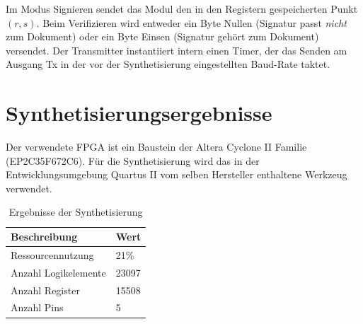 Im Modus Signieren sendet das Modul den in den Registern gespeicherten Punkt $(r, s)$. Beim Verifizieren wird entweder ein Byte Nullen (Signatur passt \textit{nicht} zum Dokument) oder ein Byte Einsen (Signatur gehört zum Dokument) versendet. Der Transmitter instantiiert intern einen Timer, der das Senden am Ausgang Tx in der vor der Synthetisierung eingestellten Baud-Rate taktet. \\



\section{Synthetisierungsergebnisse}

Der verwendete FPGA ist ein Baustein der Altera Cyclone II Familie (EP2C35F672C6). Für die Synthetisierung wird das in der Entwicklungsumgebung Quartus II vom selben Hersteller enthaltene Werkzeug verwendet. \\

\begin{table} [h]
	\centering 
	\begin{tabular}{ | p{6cm} | p{3cm} | }
		\hline
		\textbf{Beschreibung} & \textbf{Wert}\\
		\hline
		Ressourcennutzung & 21\% \\
		\hline
		Anzahl Logikelemente & 23097 \\
		\hline
		Anzahl Register & 15508 \\
		\hline
		Anzahl Pins & 5 \\
		\hline
	\end{tabular}
	\caption{Ergebnisse der Synthetisierung}
	\label{tab:vhdl-impl-de2}
\end{table}

